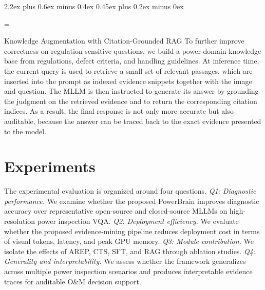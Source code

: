 \documentclass[journal,twoside,web]{ieeecolor}
\makeatletter
\renewcommand{\subsection}{\@startsection{subsection}{2}{\z@}%
  {2.2ex plus 0.6ex minus 0.4ex}%
  {0.45ex plus 0.2ex minus 0ex}%
  {\color{myorange}\normalsize\normalfont\everymath={\sf}\sf\itshape\raggedright}}
\makeatother
\begin{document}
\subsection{Knowledge Augmentation with Citation-Grounded RAG}
\label{sec:rag}
To further improve correctness on regulation-sensitive questions, we build a power-domain knowledge base from regulations, defect criteria, and handling guidelines. At inference time, the current query is used to retrieve a small set of relevant passages, which are inserted into the prompt as indexed evidence snippets together with the image and question. The MLLM is then instructed to generate its answer by grounding the judgment on the retrieved evidence and to return the corresponding citation indices. As a result, the final response is not only more accurate but also auditable, because the answer can be traced back to the exact evidence presented to the model.

\section{Experiments}
\label{sec:experiments}

The experimental evaluation is organized around four questions.
\emph{Q1: Diagnostic performance.}
We examine whether the proposed PowerBrain improves diagnostic accuracy over representative open-source and closed-source MLLMs on high-resolution power inspection VQA.
\emph{Q2: Deployment efficiency.}
We evaluate whether the proposed evidence-mining pipeline reduces deployment cost in terms of visual tokens, latency, and peak GPU memory.
\emph{Q3: Module contribution.}
We isolate the effects of AREP, CTS, SFT, and RAG through ablation studies.
\emph{Q4: Generality and interpretability.}
We assess whether the framework generalizes across multiple power inspection scenarios and produces interpretable evidence traces for auditable O\&M decision support.
\end{document}
